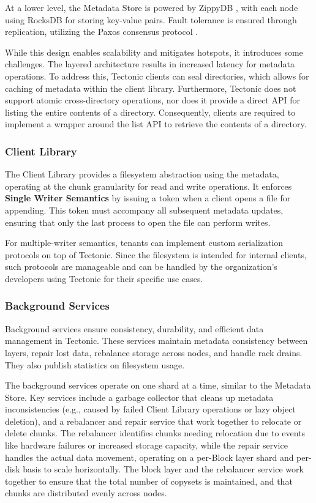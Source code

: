 At a lower level, the Metadata Store is powered by ZippyDB \cite{zippydb}, with each node using RocksDB \cite{rocksdb} for storing key-value pairs. Fault tolerance is ensured through replication, utilizing the Paxos consensus protocol \cite{paxos}.

While this design enables scalability and mitigates hotspots, it introduces some challenges. The layered architecture results in increased latency for metadata operations. To address this, Tectonic clients can seal directories, which allows for caching of metadata within the client library. Furthermore, Tectonic does not support atomic cross-directory operations, nor does it provide a direct API for listing the entire contents of a directory. Consequently, clients are required to implement a wrapper around the list API to retrieve the contents of a directory.


\subsubsection{Client Library} \label{sec:client_library}

The Client Library provides a filesystem abstraction using the metadata, operating at the chunk granularity for read and write operations. It enforces \textbf{Single Writer Semantics} by issuing a token when a client opens a file for appending. This token must accompany all subsequent metadata updates, ensuring that only the last process to open the file can perform writes.

For multiple-writer semantics, tenants can implement custom serialization protocols on top of Tectonic. Since the filesystem is intended for internal clients, such protocols are manageable and can be handled by the organization's developers using Tectonic for their specific use cases.


\subsubsection{Background Services} \label{sec:background_services}

Background services ensure consistency, durability, and efficient data management in Tectonic. These services maintain metadata consistency between layers, repair lost data, rebalance storage across nodes, and handle rack drains. They also publish statistics on filesystem usage.

The background services operate on one shard at a time, similar to the Metadata Store. Key services include a garbage collector that cleans up metadata inconsistencies (e.g., caused by failed Client Library operations or lazy object deletion), and a rebalancer and repair service that work together to relocate or delete chunks. The rebalancer identifies chunks needing relocation due to events like hardware failures or increased storage capacity, while the repair service handles the actual data movement, operating on a per-Block layer shard and per-disk basis to scale horizontally. The block layer and the rebalancer service work together to ensure that the total number of copysets\cite{copyset} is maintained, and that chunks are distributed evenly across nodes. 

